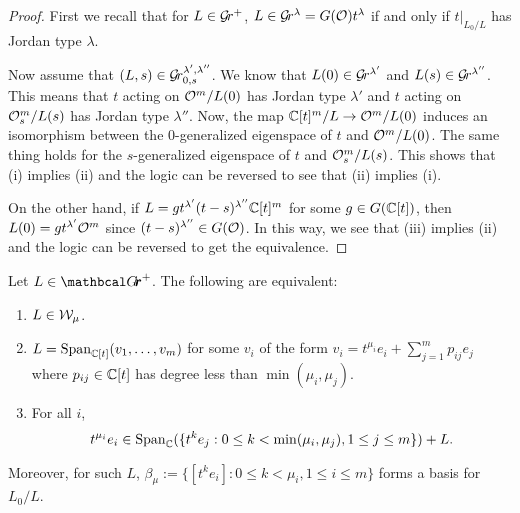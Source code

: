 \documentclass[draft]{article}
\begin{document}
\begin{proof}
First we recall that for $ L \in \mathcal{G}\!r^+$, $ L \in \mathcal{G}\!r^{\lambda} = G(\mathcal O)t^\lambda $ if and only if $ t |_{L_0/L} $ has Jordan type $ \lambda$. 

    Now assume that $ (L, s) \in \mathcal{G}\!r^{\lambda', \lambda''}_{0,s}$. We know that  $ L(0) \in \mathcal{G}\!r^{\lambda'}$ and $L(s) \in \mathcal{G}\!r^{\lambda''} $.  This means that $t $ acting on 
    $\mathcal O^m/L(0)$ has Jordan type $ \lambda'$ and $ t$ acting on 
    $\mathcal O_s^m/L(s)$ has Jordan type $ \lambda''$.  Now, the map 
    $\mathbb C[t]^m/L\to \mathcal O^m/L(0)$ induces an isomorphism between the $0$-generalized eigenspace of $ t$ and $ \mathcal O^m / L(0)$.   The same thing holds for the $s$-generalized eigenspace of $t $ and $ \mathcal O_s^m/L(s)$. This shows that (i) implies (ii) and the logic can be reversed to see that (ii) implies (i).  \marginpar[]{*}
    
    On the other hand, if $ L = g t^{\lambda'} (t-s)^{\lambda''} \mathbb C[t]^m$ for some $ g \in G(\mathbb C[t])$, then $ L(0) = g t^{\lambda'}\mathcal O^m $ since 
    $ (t-s)^{\lambda''} \in G(\mathcal O)$. In this way, we see that (iii) implies (ii) and the logic can be reversed to get the equivalence.
\end{proof}

\begin{lemma} \label{le:Wmu}
    Let $ L \in \Grth^+$.  The following are equivalent:
    \begin{enumerate}
        \item $ L \in \mathcal W_\mu$.
                \item $ L = \operatorname{Span}_{\mathbb C[t]}(v_1, \dots, v_m)$ for some $ v_i $ of the form $ v_i = t^{\mu_i} e_i + \sum_{j=1}^m p_{ij} e_j $ where $ p_{ij} \in \mathbb C[t] $ has degree less than $ \min(\mu_i, \mu_j)$.
        \item  For all $ i $, 
        $$ t^{\mu_i} e_i \in \operatorname{Span}_\mathbb C(\{t^k e_j : 0 \le k < \min(\mu_i, \mu_j), 1 \le j \le m \}) + L. $$
    \end{enumerate}
    Moreover, for such $L $, $ \beta_\mu := \{ [t^k e_i] : 0 \le k < \mu_i, 1 \le i \le m\}$ forms a basis for $ L_0/L$. 
\end{lemma}

\end{document}
